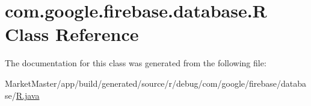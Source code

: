 \hypertarget{classcom_1_1google_1_1firebase_1_1database_1_1R}{}\section{com.\+google.\+firebase.\+database.\+R Class Reference}
\label{classcom_1_1google_1_1firebase_1_1database_1_1R}


The documentation for this class was generated from the following file\+:\begin{DoxyCompactItemize}
\item 
Market\+Master/app/build/generated/source/r/debug/com/google/firebase/database/\mbox{\hyperlink{debug_2com_2google_2firebase_2database_2R_8java}{R.\+java}}\end{DoxyCompactItemize}

